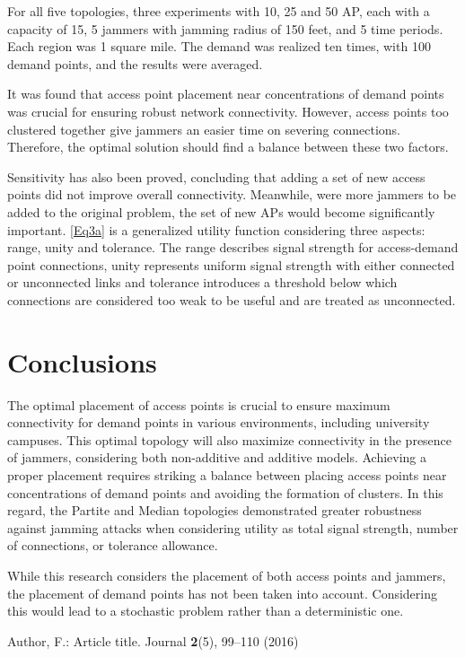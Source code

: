 \documentclass[runningheads]{llncs}
\begin{document}
	For all five topologies, three experiments with 10, 25 and 50 AP, each with a capacity of 15, 5 jammers with jamming radius of 150 feet, and 5 time periods. Each region was 1 square mile. The demand was realized ten times, with 100 demand points, and the results were averaged.
	
	It was found that access point placement near concentrations of demand points was crucial for ensuring robust network connectivity. However, access points too clustered together give jammers an easier time on severing connections. Therefore, the optimal solution should find a balance between these two factors. 
	
	Sensitivity has also been proved, concluding that adding a set of new access points did not improve overall connectivity. Meanwhile, were more jammers to be added to the original problem, the set of new APs would become significantly important.
	\ref{Eq3a} is a generalized utility function considering three aspects: range, unity and tolerance.
	The range describes signal strength for access-demand point connections, unity represents uniform signal strength with either connected or unconnected links and tolerance introduces a threshold below which connections are considered too weak to be useful and are treated as unconnected.
	
	
	
	\section{Conclusions}
	
	The optimal placement of access points is crucial to ensure maximum connectivity for demand points in various environments, including university campuses. This optimal topology will also maximize connectivity in the presence of jammers, considering both non-additive and additive models.
	Achieving a proper placement requires striking a balance between placing access points near concentrations of demand points and avoiding the formation of clusters.	In this regard, the Partite and Median topologies demonstrated greater robustness against jamming attacks when considering utility as total signal strength, number of connections, or tolerance allowance.
	
	While this research considers the placement of both access points and jammers, the placement of demand points has not been taken into account. Considering this would lead to a stochastic problem rather than a deterministic one.
	
	
	\begin{thebibliography}{8}
		Author, F.: Article title. Journal \textbf{2}(5), 99--110 (2016)
		
	\end{thebibliography}
\end{document}
